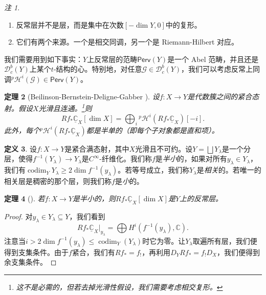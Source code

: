 \documentclass{amsart}
\newtheorem{thm}{定理}[section]
\theoremstyle{definition}
\newtheorem{defn}[thm]{定义}
\theoremstyle{remark}
\newtheorem{rmks}[thm]{注}
\theoremstyle{plain}
\theoremstyle{definition}
\theoremstyle{remark}
\newcommand{\C}{\mathbb{C}}
\newcommand{\mc}[1]{\mathcal{#1}}
\newcommand{\on}[1]{\operatorname{#1}}
\newcommand{\ms}[1]{\mathsf{#1}}
\newcommand{\ul}[1]{\underline{#1}}
\newcommand{\1}{\mathbf{1}}
\newcommand{\2}{\mathbf{2}}
\newcommand{\3}{\mathbf{3}}
\begin{document}
\begin{rmks}\leavevmode
    \begin{enumerate}
        \item 反常层并不是层，而是集中在次数\([-\dim Y, 0]\)中的复形。
        \item 它们有两个来源。一个是相交同调，另一个是 Riemann-Hilbert 对应。
    \end{enumerate}
\end{rmks}

我们需要用到如下事实：\(Y\)上反常层的范畴\(\ms{Perv}(Y)\)是一个 Abel 范畴，并且还是\(\mc{D}_c^b(Y)\)上某个\(t\)-结构的心。特别地，对任意\(\mc{G} \in \mc{D}_c^b (Y)\)，我们可以考虑反常上同调\(^p\mc{H}^i(\mc{G}) \in \ms{Perv}(Y)\)。

\begin{thm}[Beilinson-Bernstein-Deligne-Gabber {\cite{BBD1982}}]
    设\(f \colon X \to Y\)是代数簇之间的紧合态射。假设\(X\)光滑且连通。\footnote{这不是必需的，但若去掉光滑性假设，我们需要考虑相交复形。}则
    \[ R f_* \ul{\C}_X [\dim X] = \bigoplus_{i} {^p\mc{H}^i}(R f_* \ul{\C}_X)[-i]. \]
    此外，每个\(^p\mc{H}^i (R f_* \ul{\C}_X)\)都是半单的（即每个子对象都是直和项）。
\end{thm}

\begin{defn}
    设\(f \colon X \to Y\)是紧合满态射，其中\(X\)光滑且不可约。设\(Y = \bigsqcup Y_{\lambda}\)是一个分层，使得\(f^{-1}(Y_{\lambda}) \to Y_{\lambda}\)是\(C^{\infty}\)-纤维化。我们称\(f\)是\textit{半小}的，如果对所有\(y_{\lambda} \in Y_{\lambda}\)，我们有\(\on{codim}_Y Y_{\lambda} \geq 2 \dim f^{-1} (y_{\lambda})\)。若等号成立，我们称\(Y_{\lambda}\)是\textit{相关}的。若唯一的相关层是稠密的那个层，则我们称\(f\)是\textit{小}的。
\end{defn}

\begin{thm}[{\cite{DeCataldoMigliorini2002}}]
    若\(f \colon X \to Y\)是半小的，则\(R f_* \ul{\C}_X [\dim X]\)是\(Y\)上的反常层。
\end{thm}

\begin{proof}
    对\(y_{\lambda} \in Y_{\lambda} \subseteq Y\)，我们看到
    \[ R f_* \ul{\C}_X |_{y_{\lambda}} = \bigoplus H^i (f^{-1}(y_{\lambda}), \C). \]
    注意当\(i > 2 \dim f^{-1}(y_{\lambda}) \leq \on{codim}_Y (Y_{\lambda})\)时它为零。让\(Y_{\lambda}\)取遍所有层，我们便得到支集条件。由于\(f\)紧合，我们有\(R f_* = f_!\)，再利用\(D_Y R f_* = f_! D_X\)，我们便得到余支集条件。
\end{proof}
\end{document}
